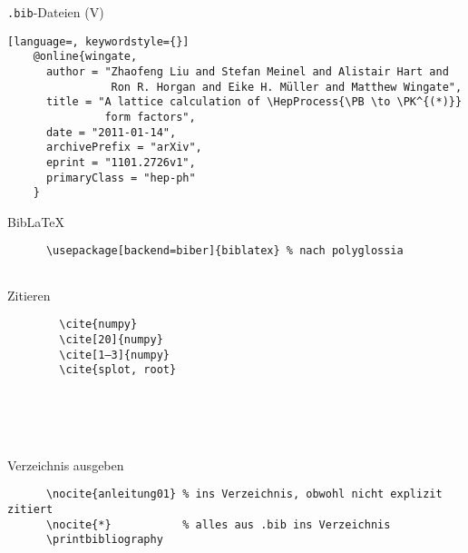 \begin{frame}[fragile]{\texttt{.bib}-Dateien (V)}
  \begin{lstlisting}[language=, keywordstyle={}]
    @online{wingate,
      author = "Zhaofeng Liu and Stefan Meinel and Alistair Hart and
                Ron R. Horgan and Eike H. Müller and Matthew Wingate",
      title = "A lattice calculation of \HepProcess{\PB \to \PK^{(*)}}
               form factors",
      date = "2011-01-14",
      archivePrefix = "arXiv",
      eprint = "1101.2726v1",
      primaryClass = "hep-ph"
    }
  \end{lstlisting}
  \vspace{1em}
\end{frame}

\begin{frame}[fragile]{Bib\LaTeX\hfill{}}
  \begin{Packages}
    \begin{lstlisting}
      \usepackage[backend=biber]{biblatex} % nach polyglossia
      
    \end{lstlisting}
  \end{Packages}
  \begin{tblock}{Zitieren}
    \begin{minipage}{0.6\linewidth}
      \begin{lstlisting}
        \cite{numpy}
        \cite[20]{numpy}
        \cite[1–3]{numpy}
        \cite{splot, root}
      \end{lstlisting}
    \end{minipage}
    \begin{minipage}{0.35\linewidth}
      \cite{numpy} \\
      \cite[20]{numpy} \\
      \cite[1-3]{numpy} \\
      \cite{splot, root}
    \end{minipage}
  \end{tblock}
  \begin{tblock}{Verzeichnis ausgeben}
    \begin{lstlisting}
      \nocite{anleitung01} % ins Verzeichnis, obwohl nicht explizit zitiert
      \nocite{*}           % alles aus .bib ins Verzeichnis
      \printbibliography
    \end{lstlisting}
  \end{tblock}
\end{frame}

